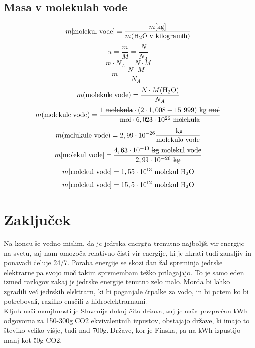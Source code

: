 \documentclass[a4paper,12pt]{article}
\begin{document}
\subsection{Masa v molekulah vode}
$$ m[\textnormal{molekul vode}] = \frac{m[\textnormal{kg}]}{m(\textnormal{H}_2\textnormal{O} \textnormal{ v kilogramih})}$$
$$ n = \frac{m}{M} = \frac{N}{N_A}$$
$$ m \cdot N_A = N \cdot M$$
$$ m = \frac{N \cdot M}{N_A}$$
$$ m(\textnormal{molekule vode}) = \frac{N \cdot M(\textnormal{H}_2\textnormal{O})}{N_A}$$
$$ m(\textnormal{molekule vode}) = \frac{1 \textnormal{ \sout{molekula}} \cdot (2 \cdot 1,008 + 15,999) \textnormal{ kg \sout{mol}}}{\textnormal{\sout{mol}} \cdot 6,023 \cdot 10^{26} \textnormal{ \sout{molekula}}}$$
$$ m(\textnormal{molukule vode}) = 2,99 \cdot 10^{-26} \frac{\textnormal{ kg}}{\textnormal{molekulo vode}}$$
$$ m[\textnormal{molekul vode}] = \frac{4,63 \cdot 10^{-13} \textnormal { \sout{kg} molekul vode}}{2,99 \cdot 10^{-26} \textnormal{ \sout{kg}}}$$
$$ m[\textnormal{molekul vode}] = 1,55 \cdot 10^{13} \textnormal { molekul H}_2\textnormal{O}$$
$$ m[\textnormal{molekul vode}] = 15,5 \cdot 10^{12} \textnormal { molekul H}_2\textnormal{O}$$



\newpage
\section{Zaključek}
Na koncu še vedno mislim, da je jedrska energija trenutno najboljši vir energije na svetu, saj nam omogoča relativno čisti vir energije, ki je hkrati tudi zansljiv in ponavadi deluje 24/7. Poraba energije se skozi dan žal spreminja jedrske elektrarne pa svojo moč takim spremembam težko prilagajajo. To je samo eden izmed razlogov zakaj je jedrske energije tenutno zelo malo. Morda bi lahko zgradili več jedrskih elektrarn, ki bi poganjale črpalke za vodo, in bi potem ko bi potrebovali, razilko enačili z hidroelektrarnami.\\
Kljub naši manjhnosti je Slovenija dokaj čita država, saj je naša povprečan kWh odgovorna za 150-300g CO2 ekvivalentnih izpustov, obstajajo države, ki imajo to števiko veliko višje, tudi nad 700g. Države, kor je Finska, pa na kWh izpustijo manj kot 50g CO2.
\newpage
\end{document}
